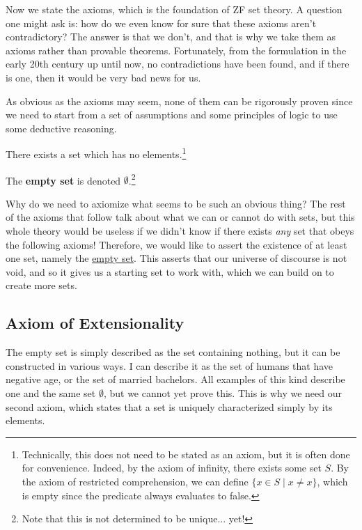   Now we state the axioms, which is the foundation of ZF set theory. A question one might ask is: how do we even know for sure that these axioms aren't contradictory? The answer is that we don't, and that is why we take them as axioms rather than provable theorems. Fortunately, from the formulation in the early 20th century up until now, no contradictions have been found, and if there is one, then it would be very bad news for us.  
  
  As obvious as the axioms may seem, none of them can be rigorously proven since we need to start from a set of assumptions and some principles of logic to use some deductive reasoning. 

  \begin{axiom}
    \label{thm:axiom-of-existence}
    There exists a set which has no elements.\footnote{Technically, this does not need to be stated as an axiom, but it is often done for convenience. Indeed, by the axiom of infinity, there exists some set $S$. By the axiom of restricted comprehension, we can define $\{x \in S \mid x \neq x\}$, which is empty since the predicate always evaluates to false. }
  \end{axiom}

  \begin{definition}
    \label{def:empty-set}
    The \textbf{empty set} is denoted $\emptyset$.\footnote{Note that this is not determined to be unique... yet!} 
  \end{definition}

  Why do we need to axiomize what seems to be such an obvious thing? The rest of the axioms that follow talk about what we can or cannot do with sets, but this whole theory would be useless if we didn't know if there exists \textit{any} set that obeys the following axioms! Therefore, we would like to assert the existence of at least one set, namely the \hyperref[def:empty-set]{empty set}. This asserts that our universe of discourse is not void, and so it gives us a starting set to work with, which we can build on to create more sets.   

\subsection{Axiom of Extensionality} 

  The empty set is simply described as the set containing nothing, but it can be constructed in various ways. I can describe it as the set of humans that have negative age, or the set of married bachelors. All examples of this kind describe one and the same set $\emptyset$, but we cannot yet prove this. This is why we need our second axiom, which states that a set is uniquely characterized simply by its elements. 

